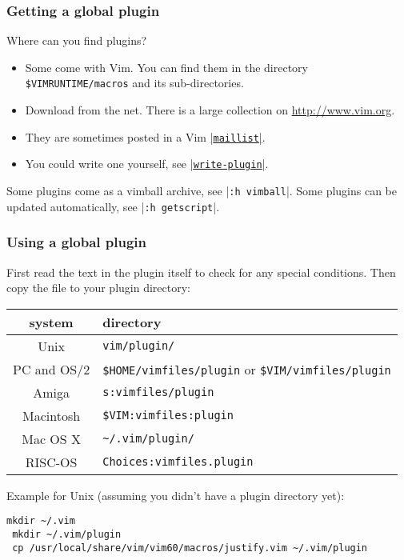 \subsubsection{Getting a global plugin}

Where can you find plugins?
\begin{itemize}
				\item Some come with Vim.
								You can find them in the directory \verb!$VIMRUNTIME/macros! and its sub-directories.
				\item Download from the net. There is a large collection on \url{http://www.vim.org}.
				\item They are sometimes posted in a Vim \hyperref[maillist]{|\texttt{maillist}|}.
				\item You could write one yourself, see \hyperref[write-plugin]{|\texttt{write-plugin}|}.
\end{itemize}

Some plugins come as a vimball archive, see |\verb!:h vimball!|.
Some plugins can be updated automatically, see |\verb!:h getscript!|.

\subsubsection{Using a global plugin}

First read the text in the plugin itself to check for any special conditions.
Then copy the file to your plugin directory:

\begin{longtable}{c l}
		system & directory \\ \hline
		Unix & \verb!vim/plugin/! \\
		PC and OS/2 & \verb!$HOME/vimfiles/plugin! or \verb!$VIM/vimfiles/plugin! \\
		Amiga & \verb!s:vimfiles/plugin! \\
		Macintosh & \verb!$VIM:vimfiles:plugin! \\
		Mac OS X & \verb!~/.vim/plugin/! \\
		RISC-OS & \verb!Choices:vimfiles.plugin!
\end{longtable}

Example for Unix (assuming you didn't have a plugin directory yet):

 \begin{Verbatim}[samepage=true]
 mkdir ~/.vim
 mkdir ~/.vim/plugin
 cp /usr/local/share/vim/vim60/macros/justify.vim ~/.vim/plugin
 \end{Verbatim}

